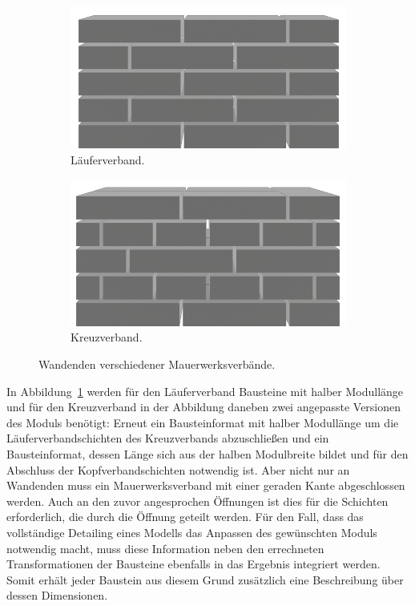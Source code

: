 \begin{figure}[htb]
    \begin{subfigure}[b]{0.5\columnwidth}
      \includegraphics[width=\columnwidth]{fig/concept_wall_endings_1.png}
      \caption{Läuferverband.}
      \label{fig:concept:lauferverband_ending}
    \end{subfigure}
    \hfill
    \begin{subfigure}[b]{0.5\columnwidth}
      \includegraphics[width=\columnwidth]{fig/concept_wall_endings_2.png}
      \caption{Kreuzverband.}
      \label{fig:concept:kreuzverband_ending}
    \end{subfigure}
  \caption{Wandenden verschiedener Mauerwerksverbände.}
\end{figure}

In Abbildung~\ref{fig:concept:lauferverband_ending} werden für den Läuferverband Bausteine mit halber Modullänge und für den Kreuzverband in der Abbildung daneben zwei angepasste Versionen des Moduls benötigt:
Erneut ein Bausteinformat mit halber Modullänge um die Läuferverbandschichten des Kreuzverbands abzuschließen und ein Bausteinformat, dessen Länge sich aus der halben Modulbreite bildet und für den Abschluss der Kopfverbandschichten notwendig ist.
Aber nicht nur an Wandenden muss ein Mauerwerksverband mit einer geraden Kante abgeschlossen werden.
Auch an den zuvor angesprochen Öffnungen ist dies für die Schichten erforderlich, die durch die Öffnung geteilt werden.
Für den Fall, dass das vollständige Detailing eines Modells das Anpassen des gewünschten Moduls notwendig macht, muss diese Information neben den errechneten Transformationen der Bausteine ebenfalls in das Ergebnis integriert werden.
Somit erhält jeder Baustein aus diesem Grund zusätzlich eine Beschreibung über dessen Dimensionen.

